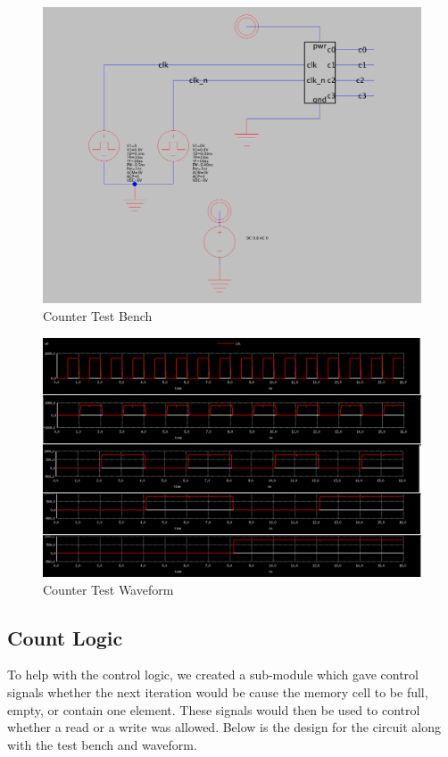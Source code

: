 \documentclass[a4paper]{article}
\begin{document}
\begin{figure}[H]
	\centering
	\includegraphics[scale=0.26]{counterTest}
	\caption{Counter Test Bench}
	\label{fig:counterTest}
\end{figure}

\begin{figure}[H]
	\centering
	\includegraphics[scale=0.26]{counterWaveform}
	\caption{Counter Test Waveform}
	\label{fig:counterWaveform}
\end{figure}


\subsection{Count Logic}
\label{sec:count_logic_design}

To help with the control logic, we created a sub-module which gave control signals whether the next iteration would be cause the memory cell to be full, empty, or contain one element. These signals would then be used to control whether a read or a write was allowed. Below is the design for the circuit along with the test bench and waveform.
\end{document}
